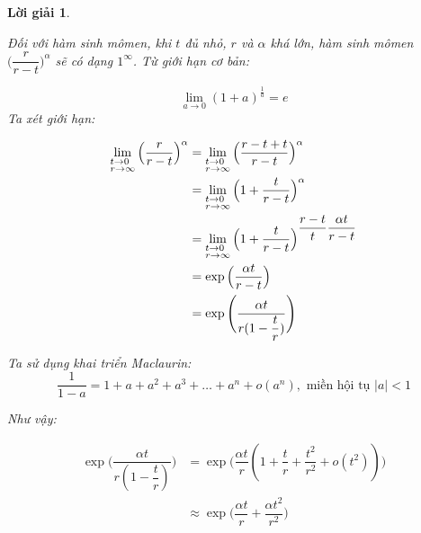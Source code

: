 \documentclass[14pt, a4paper]{article}
\theoremstyle{sltheorem}
\theoremstyle{soltheorem}
\newtheorem*{loigiai}{Lời giải}
\begin{document}
\begin{loigiai}
\begin{enumerate}
        Đối với hàm sinh mômen, khi $t$ đủ nhỏ, $r$ và $\alpha$ khá lớn, hàm sinh mômen $\Big( \dfrac{r}{r-t} \Big)^{\alpha}$ sẽ có dạng $1^{\infty}$.
        Từ giới hạn cơ bản:

        \begin{equation*}
            \lim_{a \rightarrow 0} (1 + a)^{\frac{1}{a}} = e
        \end{equation*}
        Ta xét giới hạn:

        \begin{equation*} 
            \begin{aligned}
                \lim_{\begin{subarray}{l} t \rightarrow 0 \\ r \rightarrow \infty \end{subarray}} \Big( \dfrac{r}{r-t} \Big)^{\alpha} &= \lim_{\begin{subarray}{l} t \rightarrow 0 \\ r \rightarrow \infty \end{subarray}} \Big( \dfrac{r-t + t}{r-t} \Big)^{\alpha} \\
                &= \lim_{\begin{subarray}{l} t \rightarrow 0 \\ r \rightarrow \infty \end{subarray}} \Big(1 + \dfrac{t}{r-t} \Big)^{\alpha} \\
                &= \lim_{\begin{subarray}{l} t \rightarrow 0 \\ r \rightarrow \infty \end{subarray}} \Big(1 + \dfrac{t}{r-t} \Big)^{\dfrac{r-t}{t} \dfrac{\alpha t}{r-t}} \\
                &= \exp\Big(\dfrac{\alpha t}{r-t} \Big) \\
                &= \exp\Bigg(\dfrac{\alpha t}{r(1 - \dfrac{t}{r})} \Bigg)
            \end{aligned}
        \end{equation*}

        Ta sử dụng khai triển Maclaurin:
        \begin{equation*}
            \dfrac{1}{1-a} = 1 + a + a^2 + a^3 + \dots + a^n + o(a^n), \text{ miền hội tụ } \lvert a \rvert < 1
        \end{equation*}

        Như vậy:

        \begin{equation*}
            \begin{aligned}
                \exp\Bigg(\dfrac{\alpha t}{r(1 - \dfrac{t}{r})} \Bigg) &= \exp\Bigg(\dfrac{\alpha t}{r}(1 + \dfrac{t}{r} + \dfrac{t^2}{r^2} + o(t^2)) \Bigg) \\
                &\approx \exp\Bigg( \dfrac{\alpha t}{r} + \dfrac{\alpha t^2}{r^2}\Bigg)
            \end{aligned}
        \end{equation*}


\end{enumerate}
\end{loigiai}
\end{document}
